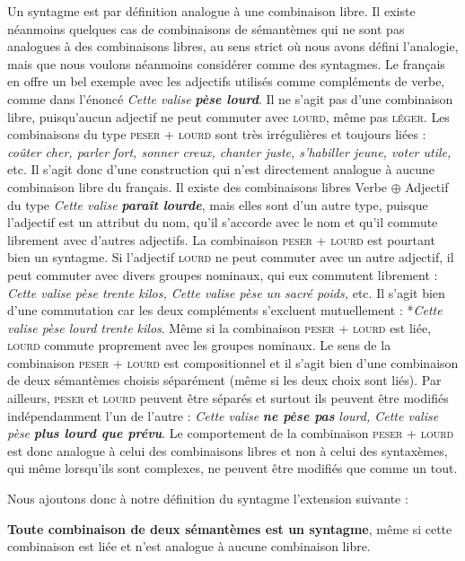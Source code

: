 Un syntagme est par définition analogue à une combinaison libre. Il existe néanmoins quelques cas de combinaisons de sémantèmes qui ne sont pas analogues à des combinaisons libres, au sens strict où nous avons défini l’analogie, mais que nous voulons néanmoins considérer comme des syntagmes. Le français en offre un bel exemple avec les adjectifs utilisés comme compléments de verbe, comme dans l’énoncé \textit{Cette valise} \textbf{\textit{pèse lourd}}. Il ne s’agit pas d’une combinaison libre, puisqu’aucun adjectif ne peut commuter avec \textsc{lourd}, même pas \textsc{léger}. Les combinaisons du type \textsc{peser} + \textsc{lourd} sont très irrégulières et toujours liées : \textit{coûter cher, parler fort, sonner creux, chanter juste, s’habiller jeune, voter utile,} etc. Il s’agit donc d’une construction qui n’est directement analogue à aucune combinaison libre du français. Il existe des combinaisons libres Verbe ${\oplus}$ Adjectif du type \textit{Cette valise} \textbf{\textit{paraît lourde}}, mais elles sont d’un autre type, puisque l’adjectif est un attribut du nom, qu’il s’accorde avec le nom et qu’il commute librement avec d’autres adjectifs. La combinaison \textsc{peser} + \textsc{lourd} est pourtant bien un syntagme. Si l’adjectif \textsc{lourd} ne peut commuter avec un autre adjectif, il peut commuter avec divers groupes nominaux, qui eux commutent librement : \textit{Cette valise pèse trente kilos, Cette valise pèse un sacré poids,} etc. Il s’agit bien d’une commutation car les deux compléments s’excluent mutuellement : *\textit{Cette valise pèse lourd trente kilos}. Même si la combinaison \textsc{peser} + \textsc{lourd} est liée, \textsc{lourd} commute proprement avec les groupes nominaux. Le sens de la combinaison \textsc{peser} + \textsc{lourd} est compositionnel et il s’agit bien d’une combinaison de deux sémantèmes choisis séparément (même si les deux choix sont liés). Par ailleurs, \textsc{peser} et \textsc{lourd} peuvent être séparés et surtout ils peuvent être modifiés indépendamment l’un de l’autre : \textit{Cette valise} \textbf{\textit{ne pèse pas}} \textit{lourd, Cette valise pèse} \textbf{\textit{plus lourd que prévu}}. Le comportement de la combinaison \textsc{peser} + \textsc{lourd} est donc analogue à celui des combinaisons libres et non à celui des syntaxèmes, qui même lorsqu’ils sont complexes, ne peuvent être modifiés que comme un tout.

Nous ajoutons donc à notre définition du syntagme l’extension suivante :

\begin{styleLivreImportant}
\textbf{Toute combinaison de deux sémantèmes est un syntagme}, même si cette combinaison est liée et n’est analogue à aucune combinaison libre.
\end{styleLivreImportant}

